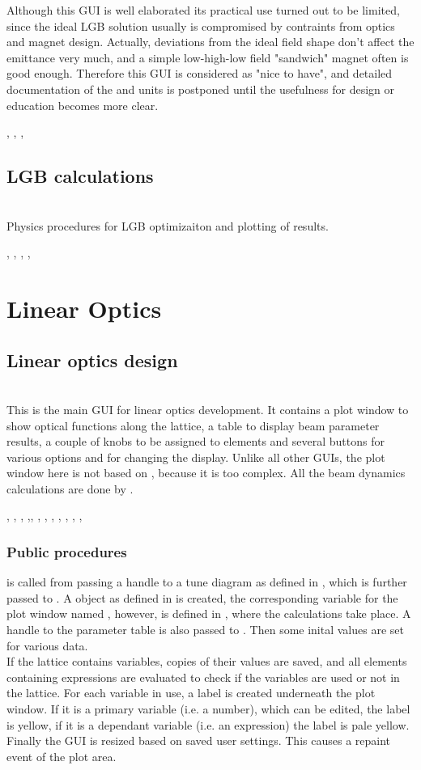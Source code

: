 \documentclass[12pt]{article}
\newcommand\code[1]{{\tt #1}}
\newcommand\guico[1]{{\color{blue}\code{#1}}}
\newcommand{\unico}[1]{{\color{burntorange}\code{#1}}}
\newcommand{\opagui}[1]{\colorbox{blue!20}{{\color{black}\code{#1}}}}
\newcommand{\oguih}[2]{\subsection{\label{#2}#1}{\Huge\opagui{#2}}\\}
\newcommand{\ogui}[1]{\hyperref[#1]{\opagui{#1}}}
\newcommand{\opaguif}[1]{\colorbox{violet!30}{{\color{black}\code{#1}}}}
\newcommand{\oguif}[1]{\hyperref[#1]{\opaguif{#1}}}
\newcommand{\opauni}[1]{\colorbox{orange!30}{{\color{black}\code{#1}}}}
\newcommand{\ounih}[2]{\subsection{\label{#2}#1}{\Huge\opauni{#2}}\\}
\newcommand{\ouni}[1]{\hyperref[#1]{\opauni{#1}}}
\newcommand{\uses}[1]{\flushleft {\bf Uses:} #1}
\newcommand{\desc}[1]{#1}
\newcommand{\ppro}[1]{\subsubsection*{Public procedures} #1}
\newcommand{\todo}[1]{{\color{red} #1}}
\begin{document}
\todo{Although this GUI is well elaborated its practical use turned out to be limited, since the ideal LGB solution usually is compromised by contraints from optics and magnet design. Actually, deviations from the ideal field shape don't affect the emittance very much, and a simple low-high-low field "sandwich" magnet often is good enough. Therefore this GUI is considered as "nice to have", and detailed documentation of the \ogui{opalgbedit} and \ouni{lgbeditlib} units is postponed until the usefulness for design or education becomes more clear.
}

\uses{\ouni{globlib}, \ouni{mathlib}, \oguif{comfigureframe}, \ouni{comauxlib}}



\ounih{LGB calculations}{lgbeditlib} 
\desc{Physics procedures for LGB optimizaiton and plotting of results.}

\uses{\ouni{globlib}, \ouni{editorlib}, \ouni{varlib}, \oguif{comfigureframe}, \ouni{comauxlib}}




\section{\label{seclino}Linear Optics}

\oguih{Linear optics design}{opalinop} 

\desc{This is the main GUI for linear optics development. It contains a plot window to show optical functions along the lattice, a table to display beam parameter results, a couple of knobs to be assigned to elements and several buttons for various options and for changing the display. Unlike all other GUIs, the plot window here is not based on \oguif{comfigureframe}, because it is too complex. All the beam dynamics calculations are done by \ouni{linoplib}.}

\uses{\oguif{knobframe}, \ogui{ostartmenu}, \ogui{otunematrix}, \ogui{owriteomrk},\ogui{obetenvmag}, \ogui{omatching}, \ouni{linoplib}, \ogui{opatunediag}, \ogui{oeleedit}, \ouni{globlib}, \ouni{mathlib}, \ouni{comvgraphlib}, \ouni{comauxlib}} 

\ppro{
\guico{Init} is called from \ogui{opamenu} passing a handle to a tune diagram as defined in \ogui{opatunediag}, which is further passed to \ouni{linoplib}. A \unico{Vplot} object as defined in \ouni{comvgraphlib} is created, the corresponding variable for the plot window named \unico{vp}, however, is defined in \ouni{linoplib}, where the calculations take place. A handle to the parameter table \guico{tab} is also passed to \ouni{linoplib}. Then some inital values are set for various data.\\
If the lattice contains variables, copies of their values are saved, and all elements containing expressions are evaluated to check if the variables are used or not in the lattice. For each variable in use, a label is created underneath the plot window. If it is a primary variable (i.e. a number), which can be edited, the label is yellow, if it is a dependant variable (i.e. an expression) the label is pale yellow.\\
Finally the GUI is resized based on saved user settings. This causes a repaint event of the plot area.
}
\end{document}
